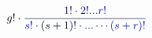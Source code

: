 \documentclass[12pt]{article}
\begin{document}
\makeatletter
\renewcommand*{\@textcolor}[3]{%
  \protect\leavevmode
  \begingroup
    \color#1{#2}#3%
  \endgroup
}
\makeatother
\begin{displaymath}
\mathcolor[RGB]{0,0,15}{g} \mathcolor[RGB]{0,0,30}{!} \mathcolor[RGB]{0,0,45}{\cdot} \mathcolor[RGB]{0,0,60}{\frac { \mathcolor[RGB]{0,0,75}{1} \mathcolor[RGB]{0,0,90}{!} \mathcolor[RGB]{0,0,105}{\cdot} \mathcolor[RGB]{0,0,120}{2} \mathcolor[RGB]{0,0,135}{!} \mathcolor[RGB]{0,0,150}{.} \mathcolor[RGB]{0,0,165}{.} \mathcolor[RGB]{0,0,180}{.} \mathcolor[RGB]{0,0,195}{r} \mathcolor[RGB]{0,0,210}{!} } { \mathcolor[RGB]{0,0,225}{s} \mathcolor[RGB]{0,0,240}{!} \mathcolor[RGB]{0,0,255}{\cdot} \mathcolor[RGB]{0,15,0}{(} \mathcolor[RGB]{0,15,15}{s} \mathcolor[RGB]{0,15,30}{+} \mathcolor[RGB]{0,15,45}{1} \mathcolor[RGB]{0,15,60}{)} \mathcolor[RGB]{0,15,75}{!} \mathcolor[RGB]{0,15,90}{\cdot} \mathcolor[RGB]{0,15,105}{.} \mathcolor[RGB]{0,15,120}{.} \mathcolor[RGB]{0,15,135}{.} \mathcolor[RGB]{0,15,150}{\cdots} \mathcolor[RGB]{0,15,165}{(} \mathcolor[RGB]{0,15,180}{s} \mathcolor[RGB]{0,15,195}{+} \mathcolor[RGB]{0,15,210}{r} \mathcolor[RGB]{0,15,225}{)} \mathcolor[RGB]{0,15,240}{!} } }
\end{displaymath}
\end{document}
